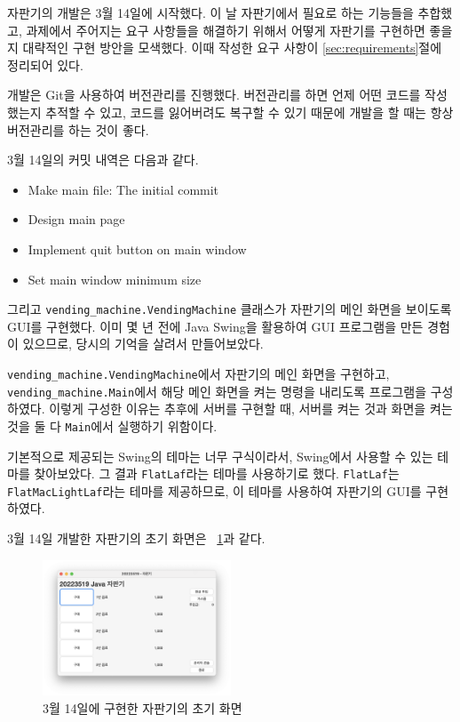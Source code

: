 \documentclass{oblivoir}
\newcommand{\figref}[1]{\figurename~\ref{#1}}
\begin{document}
    자판기의 개발은 3월 14일에 시작했다.
    이 날 자판기에서 필요로 하는 기능들을 추합했고,
    과제에서 주어지는 요구 사항들을 해결하기 위해서 어떻게 자판기를 구현하면 좋을지 대략적인 구현 방안을 모색했다.
    이때 작성한 요구 사항이 \ref{sec:requirements}절에 정리되어 있다.

    개발은 Git을 사용하여 버전관리를 진행했다.
    버전관리를 하면 언제 어떤 코드를 작성했는지 추적할 수 있고, 코드를 잃어버려도 복구할 수 있기 때문에
    개발을 할 때는 항상 버전관리를 하는 것이 좋다.

    3월 14일의 커밋 내역은 다음과 같다.
    \begin{itemize}
        \item Make main file: The initial commit
        \item Design main page
        \item Implement quit button on main window
        \item Set main window minimum size
    \end{itemize}

    그리고 \texttt{vending\_machine.VendingMachine} 클래스가 자판기의 메인 화면을 보이도록 GUI를 구현했다.
    이미 몇 년 전에 Java Swing을 활용하여 GUI 프로그램을 만든 경험이 있으므로,
    당시의 기억을 살려서 만들어보았다.

    \texttt{vending\_machine.VendingMachine}에서 자판기의 메인 화면을 구현하고,
    \texttt{vending\_machine.Main}에서 해당 메인 화면을 켜는 명령을 내리도록 프로그램을 구성하였다.
    이렇게 구성한 이유는 추후에 서버를 구현할 때,
    서버를 켜는 것과 화면을 켜는 것을 둘 다 \texttt{Main}에서 실행하기 위함이다.

    기본적으로 제공되는 Swing의 테마는 너무 구식이라서, Swing에서 사용할 수 있는 테마를 찾아보았다.
    그 결과 \texttt{FlatLaf}라는 테마를 사용하기로 했다.
    \texttt{FlatLaf}는 \texttt{FlatMacLightLaf}라는 테마를 제공하므로,
    이 테마를 사용하여 자판기의 GUI를 구현하였다.

    3월 14일 개발한 자판기의 초기 화면은 \figref{fig:0314-vending-machine}과 같다.
    \begin{figure}[h]
        \centering
        \includegraphics[width=0.5\textwidth]{0314-vending-machine}
        \caption{3월 14일에 구현한 자판기의 초기 화면}
        \label{fig:0314-vending-machine}
    \end{figure}
\end{document}
